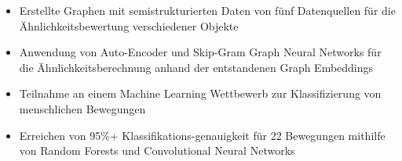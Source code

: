 
\begin{itemize}
    \item Erstellte Graphen mit semistrukturierten Daten von fünf Datenquellen für die Ähnlichkeitsbewertung verschiedener Objekte%
    \item Anwendung von Auto-Encoder und Skip-Gram Graph Neural Networks für die Ähnlichkeitsberechnung anhand der entstandenen Graph Embeddings
\end{itemize}

\divider

\begin{itemize}
    \item Teilnahme an einem Machine Learning Wettbewerb zur Klassifizierung von menschlichen Bewegungen %
    \item Erreichen von 95\%+ Klassifikations-genauigkeit für  22 Bewegungen mithilfe von Random Forests und Convolutional Neural Networks
\end{itemize}





